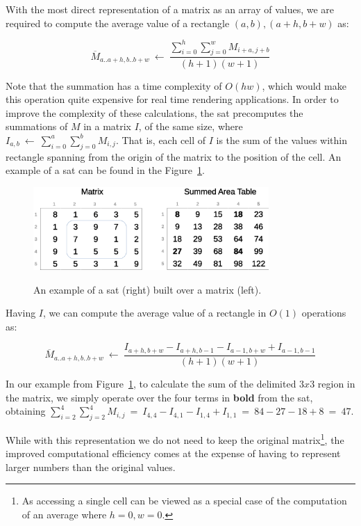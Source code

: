 \documentclass[a4paper,10pt,twoside]{book}
\begin{document}
    With the most direct representation of a matrix as an array of values, we are required to compute the average value of a rectangle $(a,b),(a+h,b+w)$ as:
    
    \[
    \overline{M}_{a..a+h,b..b+w}~\leftarrow~
    \frac{\displaystyle\sum^h_{i=0}\displaystyle\sum^w_{j=0}M_{i+a,j+b}}
    {(h+1)(w+1)}
    \]
    
    Note that the summation has a time complexity of $O(hw)$, which would make this operation quite expensive for real time rendering applications. In order to improve the complexity of these calculations, the \gls{sat} precomputes the summations of $M$ in a matrix $I$, of the same size, where $I_{a,b}~\leftarrow~\displaystyle\sum^a_{i=0}\displaystyle\sum^b_{j=0}M_{i,j}$. That is, each cell of $I$ is the sum of the values within rectangle spanning from the origin of the matrix to the position of the cell. An example of a \gls{sat} can be found in the Figure~\ref{fig:sat}.
    
    \begin{figure}[ht]
		\begin{center}
			{\includegraphics[width=0.8\textwidth]{figures/example_sat.eps}}
		\end{center}
		\caption{An example of a \acrlong{sat} (right) built over a matrix (left).}
		\label{fig:sat}
	\end{figure}
    
    Having $I$, we can compute the average value of a rectangle in $O(1)$ operations as:
    
    \[
    \overline{M}_{a..a+h,b..b+w}~\leftarrow~
    \frac{I_{a+h,b+w} - I_{a+h,b-1} - I_{a-1,b+w} + I_{a-1,b-1}}
    {(h+1)(w+1)}
    \]
    
    In our example from Figure~\ref{fig:sat}, to calculate the sum of the delimited $3x3$ region in the matrix, we simply operate over the four terms in \textbf{bold} from the \gls{sat}, obtaining
    $\displaystyle\sum^4_{i=2}\displaystyle\sum^4_{j=2}M_{i,j}~=~I_{4,4}-I_{4,1}-I_{1,4}+I_{1,1}~=~84-27-18+8~=~47$.
    
    While with this representation we do not need to keep the original matrix\footnote{As accessing a single cell can be viewed as a special case of the computation of an average where $h=0,w=0$.}, the improved computational efficiency comes at the expense of having to represent larger numbers than the original values.
	
\end{document}

